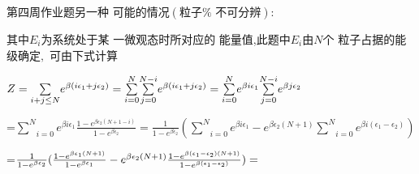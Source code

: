 \documentclass{ctexart}
\begin{document}
\begin{CJK}{GBK}{song}
\bigskip

第四周作业题另一种%
可能的情况$\left( \text{粒子%
不可分辨}\right) $:

其中$E_{i}$为系统处于某%
一微观态时所对应的%
能量值,此题中$E_{i}$由$N$个%
粒子占据的能级确定$,$%
可由下式计算

$Z=\underset{i+j\leq N}{\sum }e^{\beta \left( i\epsilon _{1}+j\epsilon
_{2}\right) }=\underset{i=0}{\overset{N}{\sum }}\underset{j=0}{\overset{N-i}{%
\sum }}e^{\beta \left( i\epsilon _{1}+j\epsilon _{2}\right) }=\underset{i=0}{%
\overset{N}{\sum }}e^{\beta i\epsilon _{1}}\underset{j=0}{\overset{N-i}{\sum 
}}e^{\beta j\epsilon _{2}}$

=$\underset{i=0}{\overset{N}{\sum }}e^{\beta i\epsilon _{1}}\frac{1-e^{\beta
\epsilon _{2}(N+1-i)}}{1-e^{\beta \epsilon _{2}}}=\frac{1}{1-e^{\beta
\epsilon _{2}}}(\underset{i=0}{\overset{N}{\sum }}e^{\beta i\epsilon
_{1}}-e^{\beta \epsilon _{2}(N+1)}\underset{i=0}{\overset{N}{\sum }}e^{\beta
i\left( \epsilon _{1}-\epsilon _{2}\right) })$

=$\frac{1}{1-e^{\beta \epsilon _{2}}}(\frac{1-e^{\beta \epsilon _{1}\left(
N+1\right) }}{1-e^{\beta \epsilon _{1}}}-e^{\beta \epsilon _{2}(N+1)}\frac{%
1-e^{\beta \left( \epsilon _{1}-\epsilon _{2}\right) \left( N+1\right) }}{%
1-e^{\beta \left( \epsilon _{1}-\epsilon _{2}\right) }})=$
\end {CJK}
\end{document}
